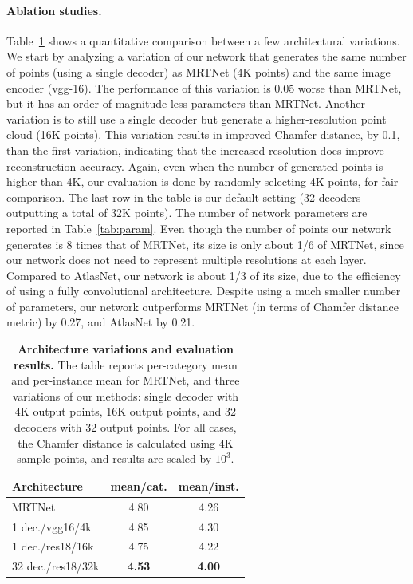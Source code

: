\paragraph*{Ablation studies.} Table~\ref{tab:alt} shows a quantitative comparison between a few architectural variations.
We start by analyzing a variation of our network that generates the same number of points (using a single decoder) as MRTNet (4K points) and the same image encoder (vgg-16).
The performance of this variation is 0.05 worse than MRTNet, but it has an order of magnitude less parameters than MRTNet.
Another variation is to still use a single decoder but generate a higher-resolution point cloud (16K points).
This variation results in improved Chamfer distance, by 0.1, than the first variation, indicating that the increased resolution does improve reconstruction accuracy. Again, even when the number of generated points is higher than 4K, our evaluation is done by randomly selecting 4K points, for fair comparison. The last row in the table is our default setting (32 decoders outputting a total of 32K points). 
The number of network parameters are reported in Table~\ref{tab:param}. Even though the number of points our network generates is 8 times that of MRTNet, its size is only about 1/6 of MRTNet, since our network does not need to represent multiple resolutions at each layer. Compared to AtlasNet, our network is about 1/3 of its size, due to the efficiency of using a fully convolutional architecture. Despite using a much smaller number of parameters, our network outperforms MRTNet (in terms of Chamfer distance metric) by 0.27, and AtlasNet by 0.21.


\begin{table}
\centering
{
\begin{tabular}{|l|c|c|}
    \hline
    Architecture &  mean/cat. & mean/inst. \\
    \hline
    MRTNet & 4.80 & 4.26 \\
    1 dec./vgg16/4k & 4.85 & 4.30\\
    1 dec./res18/16k & 4.75 & 4.22\\
    32 dec./res18/32k & \textbf{4.53} & \textbf{4.00}\\
    \hline
\end{tabular}
}
\caption{\label{tab:alt} \small
    \textbf{Architecture variations and evaluation results.} The table reports per-category mean and per-instance mean for MRTNet, and three variations of our methods: single decoder with 4K output points, 16K output points, and 32 decoders with 32 output points. For all cases, the Chamfer distance is calculated using 4K sample points, and results are scaled by $10^3$.
}
\end{table}


